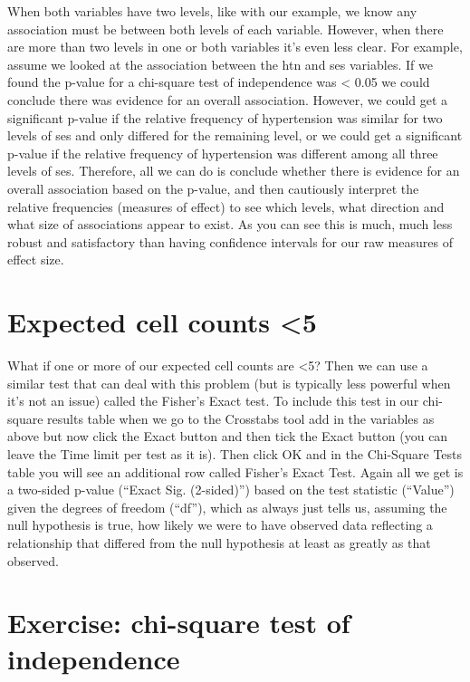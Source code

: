 \documentclass[
]{book}
\begin{document}
When both variables have two levels, like with our example, we know any association must be between both levels of each variable. However, when there are more than two levels in one or both variables it's even less clear. For example, assume we looked at the association between the htn and ses variables. If we found the p-value for a chi-square test of independence was \textless{} 0.05 we could conclude there was evidence for an overall association. However, we could get a significant p-value if the relative frequency of hypertension was similar for two levels of ses and only differed for the remaining level, or we could get a significant p-value if the relative frequency of hypertension was different among all three levels of ses. Therefore, all we can do is conclude whether there is evidence for an overall association based on the p-value, and then cautiously interpret the relative frequencies (measures of effect) to see which levels, what direction and what size of associations appear to exist. As you can see this is much, much less robust and satisfactory than having confidence intervals for our raw measures of effect size.

\hypertarget{expected-cell-counts-5}{%
\section{Expected cell counts \textless5}\label{expected-cell-counts-5}}

What if one or more of our expected cell counts are \textless5? Then we can use a similar test that can deal with this problem (but is typically less powerful when it's not an issue) called the Fisher's Exact test. To include this test in our chi-square results table when we go to the Crosstabs tool add in the variables as above but now click the Exact button and then tick the Exact button (you can leave the Time limit per test as it is). Then click OK and in the Chi-Square Tests table you will see an additional row called Fisher's Exact Test. Again all we get is a two-sided p-value (``Exact Sig. (2-sided)'') based on the test statistic (``Value'') given the degrees of freedom (``df''), which as always just tells us, assuming the null hypothesis is true, how likely we were to have observed data reflecting a relationship that differed from the null hypothesis at least as greatly as that observed.

\hypertarget{exercise-chi-square-test-of-independence}{%
\section{Exercise: chi-square test of independence}\label{exercise-chi-square-test-of-independence}}
\end{document}
